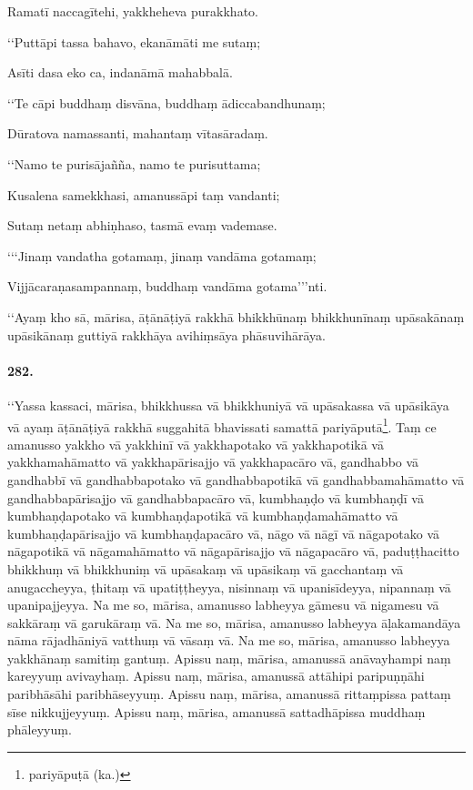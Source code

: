 Ramatī naccagītehi, yakkheheva purakkhato.

‘‘Puttāpi tassa bahavo, ekanāmāti me sutaṃ;

Asīti dasa eko ca, indanāmā mahabbalā.

‘‘Te cāpi buddhaṃ disvāna, buddhaṃ ādiccabandhunaṃ;

Dūratova namassanti, mahantaṃ vītasāradaṃ.

‘‘Namo te purisājañña, namo te purisuttama;

Kusalena samekkhasi, amanussāpi taṃ vandanti;

Sutaṃ netaṃ abhiṇhaso, tasmā evaṃ vademase.

‘‘‘Jinaṃ vandatha gotamaṃ, jinaṃ vandāma gotamaṃ;

Vijjācaraṇasampannaṃ, buddhaṃ vandāma gotama’’’nti.

‘‘Ayaṃ kho sā, mārisa, āṭānāṭiyā rakkhā bhikkhūnaṃ bhikkhunīnaṃ upāsakānaṃ upāsikānaṃ guttiyā rakkhāya avihiṃsāya phāsuvihārāya.

\paragraph{282.} ‘‘Yassa kassaci, mārisa, bhikkhussa vā bhikkhuniyā vā upāsakassa vā upāsikāya vā ayaṃ āṭānāṭiyā rakkhā suggahitā bhavissati samattā pariyāputā\footnote{pariyāpuṭā (ka.)}. Taṃ ce amanusso yakkho vā yakkhinī vā yakkhapotako vā yakkhapotikā vā yakkhamahāmatto vā yakkhapārisajjo vā yakkhapacāro vā, gandhabbo vā gandhabbī vā gandhabbapotako vā gandhabbapotikā vā gandhabbamahāmatto vā gandhabbapārisajjo vā gandhabbapacāro vā, kumbhaṇḍo vā kumbhaṇḍī vā kumbhaṇḍapotako vā kumbhaṇḍapotikā vā kumbhaṇḍamahāmatto vā kumbhaṇḍapārisajjo vā kumbhaṇḍapacāro vā, nāgo vā nāgī vā nāgapotako vā nāgapotikā vā nāgamahāmatto vā nāgapārisajjo vā nāgapacāro vā, paduṭṭhacitto bhikkhuṃ vā bhikkhuniṃ vā upāsakaṃ vā upāsikaṃ vā gacchantaṃ vā anugaccheyya, ṭhitaṃ vā upatiṭṭheyya, nisinnaṃ vā upanisīdeyya, nipannaṃ vā upanipajjeyya. Na me so, mārisa, amanusso labheyya gāmesu vā nigamesu vā sakkāraṃ vā garukāraṃ vā. Na me so, mārisa, amanusso labheyya āḷakamandāya nāma rājadhāniyā vatthuṃ vā vāsaṃ vā. Na me so, mārisa, amanusso labheyya yakkhānaṃ samitiṃ gantuṃ. Apissu naṃ, mārisa, amanussā anāvayhampi naṃ kareyyuṃ avivayhaṃ. Apissu naṃ, mārisa, amanussā attāhipi paripuṇṇāhi paribhāsāhi paribhāseyyuṃ. Apissu naṃ, mārisa, amanussā rittaṃpissa pattaṃ sīse nikkujjeyyuṃ. Apissu naṃ, mārisa, amanussā sattadhāpissa muddhaṃ phāleyyuṃ.

